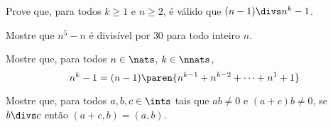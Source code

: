 \begin{exercise}
    Prove que, para todos $k \ge 1$ e $n \ge 2$, é válido que $(n-1) \divs n^k - 1$.
\end{exercise}

\begin{exercise}
    Mostre que $n^5 - n$ é divisível por $30$ para todo inteiro $n$.
\end{exercise}

\begin{exercise}
    Mostre que, para todos $n\in \nats$, $k \in \nnats$, $$n^k - 1 = (n-1)\paren{n^{k-1} + n^{k-2} + \dots + n^{1} + 1}$$
\end{exercise}

\begin{exercise}
    Mostre que, para todos $a,b,c \in \ints$ tais que $ab \ne 0$ e $(a+c)b \ne 0$, se $b \divs c$ então $(a+c,b) = (a,b)$.
\end{exercise}